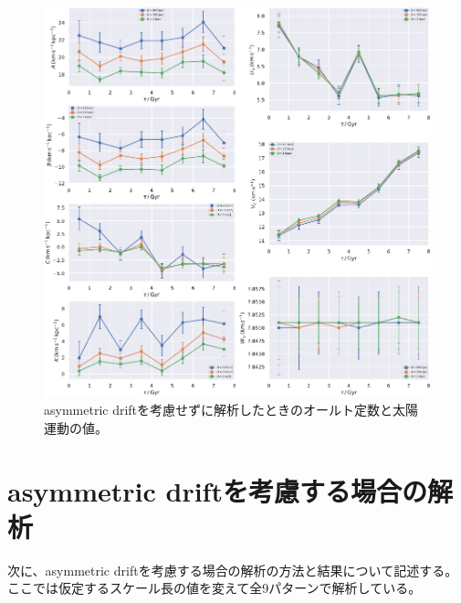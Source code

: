 \begin{figure}
	\centering
	\includegraphics[width=16cm]{fig/Observation_woAD.pdf}
	\caption{asymmetric driftを考慮せずに解析したときのオールト定数と太陽運動の値。}
	\label{fig:woAD}
\end{figure}




\section{asymmetric driftを考慮する場合の解析 \label{asymmetric driftを考慮する場合の解析}}
次に、asymmetric driftを考慮する場合の解析の方法と結果について記述する。ここでは仮定するスケール長の値を変えて全9パターンで解析している。

